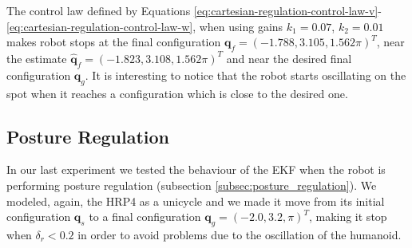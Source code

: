 \documentclass[a4paper]{article}
\begin{document}
The control law defined by Equations
\ref{eq:cartesian-regulation-control-law-v}-\ref{eq:cartesian-regulation-control-law-w},
when using gains $k_1=0.07$, $k_2=0.01$ makes robot stops at the final
configuration \mbox{$\bm{q}_f = (-1.788, 3.105, 1.562\pi)^T$}, near the estimate
$\bm{\hat{q}}_f = (-1.823, 3.108, 1.562\pi)^T$ and
near the desired final configuration $\bm{q}_g$. It is interesting to notice
that the robot starts oscillating on the spot when it reaches a configuration
which is close to the desired one.

\subsection{Posture Regulation}
In our last experiment we tested the behaviour of the EKF when the robot is
performing posture regulation (subsection \ref{subsec:posture_regulation}).
We modeled, again, the HRP4 as a unicycle and we made it move from its initial
configuration $\bm{q}_s$ to a final configuration $\bm{q}_g = (-2.0, 3.2, \pi)^T$,
making it stop when $\delta_r < 0.2$ in order to avoid problems due to
the oscillation of the humanoid.
\end{document}
